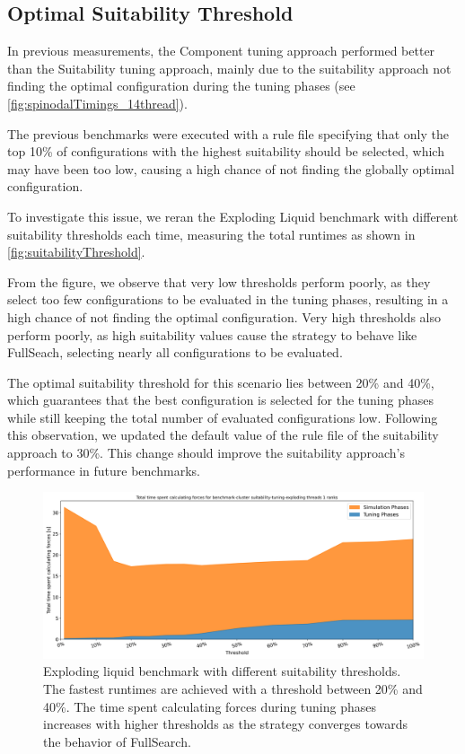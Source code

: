 \subsection{Optimal Suitability Threshold}
\label{sec:suitabilityThreshold}

In previous measurements, the Component tuning approach performed better than the Suitability tuning approach, mainly due to the suitability approach not finding the optimal configuration during the tuning phases (see \autoref{fig:spinodalTimings_14thread}).

The previous benchmarks were executed with a rule file specifying that only the top 10\% of configurations with the highest suitability should be selected, which may have been too low, causing a high chance of not finding the globally optimal configuration.

To investigate this issue, we reran the Exploding Liquid benchmark with different suitability thresholds each time, measuring the total runtimes as shown in \autoref{fig:suitabilityThreshold}.

From the figure, we observe that very low thresholds perform poorly, as they select too few configurations to be evaluated in the tuning phases, resulting in a high chance of not finding the optimal configuration. Very high thresholds also perform poorly, as high suitability values cause the strategy to behave like FullSeach, selecting nearly all configurations to be evaluated.

The optimal suitability threshold for this scenario lies between 20\% and 40\%, which guarantees that the best configuration is selected for the tuning phases while still keeping the total number of evaluated configurations low. Following this observation, we updated the default value of the rule file of the suitability approach to 30\%. This change should improve the suitability approach's performance in future benchmarks.

\begin{figure}[H]
    \centering
    \includegraphics[width=\columnwidth,trim={0cm 0cm 0cm 0.9cm},clip]{figures/Benchmark/SuitabilitySearch/SuitabilityExploding_timings_threshold_benchmark-cluster_suitability-tuning-exploding_1.png}
    \caption[
        Impact of the suitability threshold on the simulation performance
    ]{Exploding liquid benchmark with different suitability thresholds. The fastest runtimes are achieved with a threshold between 20\% and 40\%. The time spent calculating forces during tuning phases increases with higher thresholds as the strategy converges towards the behavior of FullSearch.}
    \label{fig:suitabilityThreshold}
\end{figure}

